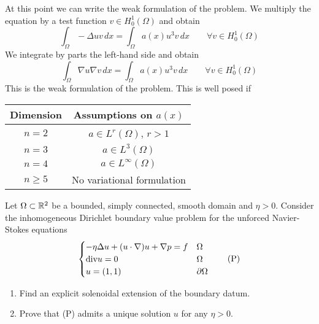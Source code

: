    At this point we can write the weak formulation of the problem. We multiply the equation by a test function \(v \in H^1_0(\Omega)\) and obtain 
    \[
        \int_\Omega - \Delta u v \, dx = \int_\Omega a(x) u^3 v \, dx \qquad \forall v \in H^1_0(\Omega)
    \]
    We integrate by parts the left-hand side and obtain
    \[
        \int_\Omega \nabla u \nabla v \, dx = \int_\Omega a(x) u^3 v \, dx \qquad \forall v \in H^1_0(\Omega)
    \]
    This is the weak formulation of the problem. This is well posed if 
    \begin{table}[h]
        \centering
        \begin{tabular}{|c|c|}
            \hline
            Dimension & Assumptions on $a(x)$ \\
            \hline
            $n = 2$ & $a \in L^r(\Omega)$, $r > 1$ \\
            $n = 3$ & $a \in L^3(\Omega)$ \\
            $n = 4$ & $a \in L^\infty(\Omega)$ \\
            $n \geq 5$ & No variational formulation \\
            \hline
        \end{tabular}
    \end{table}

\newpage
\begin{exercise}
    Let \(\Omega \subset \mathbb{R}^2\) be a bounded, simply connected, smooth domain and \(\eta > 0\). Consider the inhomogeneous Dirichlet boundary value problem for the unforced Navier-Stokes equations
    \[
        \begin{cases}
            -\eta \Delta u + (u \cdot \nabla )u + \nabla p = f & \Omega \\
            \text{div} u = 0 & \Omega \\
            u = (1,1) & \partial\Omega
        \end{cases}
        \tag*{(P)}
    \]
    \begin{enumerate}
        \item Find an explicit solenoidal extension of the boundary datum.
        \item Prove that (P) admits a unique solution \(u\) for any \(\eta > 0\).
    \end{enumerate}
\end{exercise}

